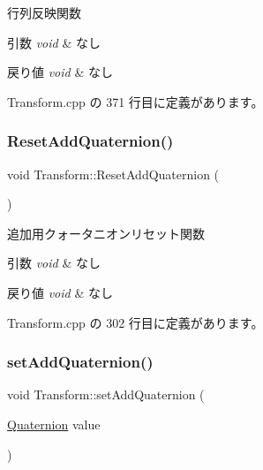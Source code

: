 行列反映関数 


\begin{DoxyParams}{引数}
{\em void} & なし \\
\hline
\end{DoxyParams}

\begin{DoxyRetVals}{戻り値}
{\em void} & なし \\
\hline
\end{DoxyRetVals}


 Transform.\+cpp の 371 行目に定義があります。

\mbox{\label{class_transform_acb3b15a0b011f21a849ca1648ed1c581}} 
\subsubsection{\texorpdfstring{Reset\+Add\+Quaternion()}{ResetAddQuaternion()}}
{\footnotesize\ttfamily void Transform\+::\+Reset\+Add\+Quaternion (\begin{DoxyParamCaption}{ }\end{DoxyParamCaption})}



追加用クォータニオンリセット関数 


\begin{DoxyParams}{引数}
{\em void} & なし \\
\hline
\end{DoxyParams}

\begin{DoxyRetVals}{戻り値}
{\em void} & なし \\
\hline
\end{DoxyRetVals}


 Transform.\+cpp の 302 行目に定義があります。

\mbox{\label{class_transform_a0f7b2731c46624ea54126e36fe1d0dd1}} 
\subsubsection{\texorpdfstring{set\+Add\+Quaternion()}{setAddQuaternion()}}
{\footnotesize\ttfamily void Transform\+::set\+Add\+Quaternion (\begin{DoxyParamCaption}\item[{\mbox{\hyperlink{_vector3_d_8h_a3ee38c9c46d9851e33a9a1113328dafc}{Quaternion}}}]{value }\end{DoxyParamCaption})}



